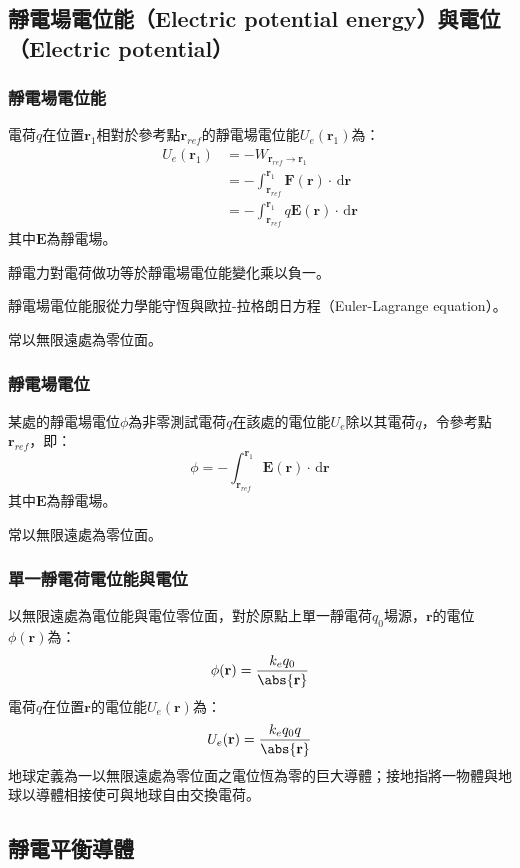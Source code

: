 \documentclass[a4paper,12pt]{report}
\begin{document}
\begin{itemize}
\subsection{靜電場電位能（Electric potential energy）與電位（Electric potential）}
\subsubsection{靜電場電位能}
電荷$q$在位置$\mathbf{r}_1$相對於參考點$\mathbf{r}_{ref}$的靜電場電位能$U_e(\mathbf{r}_1)$為：
\[\begin{aligned}
U_e(\mathbf{r}_1) &= -W_{\mathbf{r}_{ref}\to\mathbf{r}_1}\\
&= -\int_{\mathbf{r}_{ref}}^{\mathbf{r}_1} \mathbf{F}(\mathbf{r})\cdot\,\mathrm{d}\mathbf{r}\\
&= -\int_{\mathbf{r}_{ref}}^{\mathbf{r}_1} q\mathbf{E}(\mathbf{r})\cdot\,\mathrm{d}\mathbf{r}
\end{aligned}\]
其中$\mathbf{E}$為靜電場。

靜電力對電荷做功等於靜電場電位能變化乘以負一。

靜電場電位能服從力學能守恆與歐拉-拉格朗日方程（Euler-Lagrange equation）。

常以無限遠處為零位面。
\subsubsection{靜電場電位}
某處的靜電場電位$\phi$為非零測試電荷$q$在該處的電位能$U_e$除以其電荷$q$，令參考點$\mathbf{r}_{ref}$，即：
\[\phi=-\int_{\mathbf{r}_{ref}}^{\mathbf{r}_1} \mathbf{E}(\mathbf{r})\cdot\,\mathrm{d}\mathbf{r}\]
其中$\mathbf{E}$為靜電場。

常以無限遠處為零位面。
\subsubsection{單一靜電荷電位能與電位}
以無限遠處為電位能與電位零位面，對於原點上單一靜電荷$q_0$場源，$\mathbf{r}$的電位$\phi(\mathbf{r})$為：
\[\phi(\mathbf{r})=\frac{k_eq_0}{\abs{\mathbf{r}}}\]
電荷$q$在位置$\mathbf{r}$的電位能$U_e(\mathbf{r})$為：
\[U_e(\mathbf{r})=\frac{k_eq_0q}{\abs{\mathbf{r}}}\]
地球定義為一以無限遠處為零位面之電位恆為零的巨大導體；接地指將一物體與地球以導體相接使可與地球自由交換電荷。
\subsection{靜電平衡導體}

\end{itemize}
\end{document}
